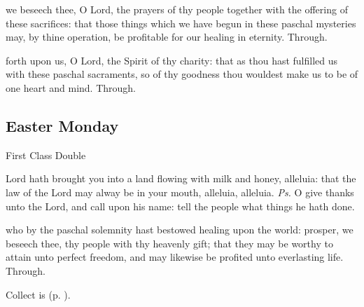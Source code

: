 
\secret\label{EasterSecret}
 we beseech thee, O Lord, the prayers of thy people together with the offering of these sacrifices: that those things which we have begun in these paschal mysteries may, by thine operation, be profitable for our healing in eternity. Through.


\postcommunion\label{EasterPostcommunion}
 forth upon us, O Lord, the Spirit of thy charity: that as thou hast fulfilled us with these paschal sacraments, so of thy goodness thou wouldest make us to be of one heart and mind. Through.


\subsection{Easter Monday}
\begin{inhead}
    {First Class Double}
\end{inhead}


\introit
{} Lord hath brought you into a land flowing with milk and honey, alleluia: that the law of the Lord may alway be in your mouth, alleluia, alleluia. \textit{Ps.} O give thanks unto the Lord, and call upon his name: tell the people what things he hath done.

\collect
 who by the paschal solemnity hast bestowed healing upon the world: prosper, we beseech thee, thy people with thy heavenly gift; that they may be worthy to attain unto perfect freedom, and may likewise be profited unto everlasting life. Through.
\begin{rubric}
     Collect is  (p. \pageref{EasterCollect}).
\end{rubric}

